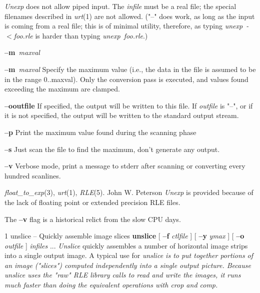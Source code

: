 {\it Unexp}
does not allow piped input.  The
{\it infile}
must be a real file; the special filenames described in 
{\it urt}{\rm (1)}
are not allowed.  ("--" does work, as long as the input is coming from
a real file; this is of minimal utility, therefore, as typing 
{\it unexp\ -\ $<$foo.rle}
is harder than typing
{\it unexp\ foo.rle}{\rm .)}
\begin{TPlist}{{\bf --m}{\it \ maxval}
}
\item[{{\bf --m}{\it \ maxval}
}]
Specify the maximum value (i.e., the data in the file is assumed to be in the 
range 0..maxval).  Only the conversion pass is executed, and values found 
exceeding the maximum are clamped.
\item[{{\bf --o}{\it }{\bf outfile}
}]
If specified, the output will be written to this file.  If 
{\it outfile}
is "--", or if it is not specified, the output will be written to the
standard output stream.
\item[{{\bf --p}}]
Print the maximum value found during the scanning phase
\item[{{\bf --s}}]
Just scan the file to find the maximum, don't generate any output.
\item[{{\bf --v}}]
Verbose mode, print a message to stderr after scanning or converting every 
hundred scanlines.
\end{TPlist}
{\it float\_to\_exp}{\rm (3),}
{\it urt}{\rm (1),}
{\it RLE}{\rm (5).}
John W. Peterson
{\it Unexp}
is provided because of the lack of floating point or extended
precision RLE files.

The 
{\bf --v}
flag is a historical relict from the slow CPU days.
\newpage


%
%
%
 1
unslice -- Quickly assemble image slices
{\bf unslice}
[
{\bf --f}
{\it ctlfile} 
] [
{\bf --y}
{\it ymax}
] [
{\bf --o}
{\it outfile}
] 
{\it infiles} ...
{\it Unslice}
quickly assembles a number of horizontal image strips into a single
output image.  A typical use for %
\it unslice \rm%
is to put together
portions of an image ("slices") computed independently into a single
output picture.  Because %
\it unslice \rm%
uses the "raw" RLE library
calls to read and write the images, it runs much faster than doing the
equivalent operations with crop and comp.

